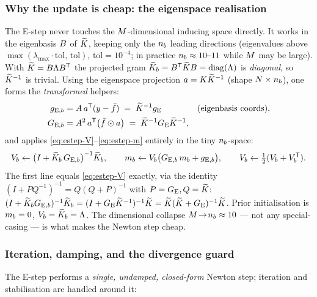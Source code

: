 \subsubsection{Why the update is cheap: the eigenspace realisation}
\label{subsubsec:estep-eigen}

The E-step never touches the $M$-dimensional inducing space directly. It works
in the eigenbasis $B$ of $\widetilde{K}$, keeping only the $n_{b}$ leading directions
(eigenvalues above $\max(\lambda_{\max}\!\cdot\!\mathrm{tol},\,\mathrm{tol})$,
$\mathrm{tol}=10^{-4}$; in practice $n_{b}\approx10\text{--}11$ while $M$ may be
large). With $\widetilde{K}=B\Lambda B^{\mathsf{T}}$ the projected gram
$\widetilde{K}_{b}=B^{\mathsf{T}}\widetilde{K}B=\operatorname{diag}(\Lambda)$ is \emph{diagonal}, so $\widetilde{K}^{-1}$
is trivial. Using the eigenspace projection $a=K\widetilde{K}^{-1}$
(shape $N\times n_{b}$), one forms the \emph{transformed} helpers:
\begin{align}
g_{\mathrm E,b} &= A\,a^{\mathsf{T}}(y-\bar{f})\;=\;\widetilde{K}^{-1}g_{\mathrm{E}}
   &&(\text{eigenbasis coords}),\\
G_{\mathrm E,b} &= A^2\,a^{\mathsf{T}}\big(\bar{f}\odot a\big)\;=\;\widetilde{K}^{-1}G_{\mathrm{E}}\widetilde{K}^{-1},
\end{align}
and applies \eqref{eq:estep-V}--\eqref{eq:estep-m} entirely in the tiny
$n_{b}$-space:
\begin{equation}
V_{b} \leftarrow \big(I+\widetilde{K}_{b}\,G_{\mathrm E,b}\big)^{-1}\widetilde{K}_{b},\qquad
m_{b} \leftarrow V_{b}\big(G_{\mathrm E,b}\,m_{b}+g_{\mathrm E,b}\big),\qquad
V_{b} \leftarrow \tfrac12(V_{b}+V_{b}^{\mathsf{T}}).
\end{equation}
The first line equals \eqref{eq:estep-V} exactly, via the identity
$(I+PQ^{-1})^{-1}=Q(Q+P)^{-1}$ with $P=G_{\mathrm{E}},Q=\widetilde{K}$:
$(I+\widetilde{K}_{b} G_{\mathrm E,b})^{-1}\widetilde{K}_{b}=(I+G_{\mathrm{E}}\widetilde{K}^{-1})^{-1}\widetilde{K}
=\widetilde{K}(\widetilde{K}+G_{\mathrm{E}})^{-1}\widetilde{K}$. Prior initialisation is $m_{b}=0$,
$V_{b}=\widetilde{K}_{b}=\Lambda$. The dimensional collapse $M\!\to\!n_{b}\approx10$ ---
not any special-casing --- is what makes the Newton step cheap.

\subsubsection{Iteration, damping, and the divergence guard}

The E-step performs a \emph{single, undamped, closed-form} Newton step; iteration
and stabilisation are handled around it:

